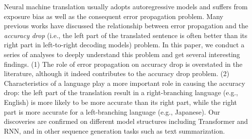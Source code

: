 Neural machine translation usually adopts autoregressive models and suffers from exposure bias as well as the consequent error propagation problem. Many previous works have discussed the relationship between error propagation and the \emph{accuracy drop} (i.e., the left part of the translated sentence is often better than its right part in left-to-right decoding models) problem. In this paper, we conduct a series of analyses to deeply understand this problem and get several interesting findings. (1) The role of error propagation on accuracy drop is overstated in the literature, although it indeed contributes to the accuracy drop problem. (2) Characteristics of a language play a more important role in causing the accuracy drop: the left part of the translation result in a right-branching language (e.g., English) is more likely to be more accurate than its right part, while the right part is more accurate for a left-branching language (e.g., Japanese). Our discoveries are confirmed on different model structures including Transformer and RNN, and in other sequence generation tasks such as text summarization.
